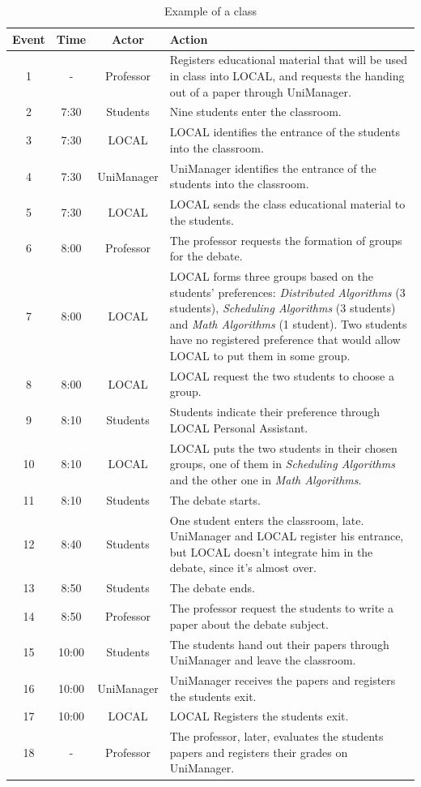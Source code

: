\documentclass{svjour3}                     %
\begin{document}
\begin{table}\centering\footnotesize
    \begin{tabular*}{1\textwidth}{@{}cccp{6.8cm}@{}}
    \toprule
    Event & Time & Actor & Action \\
    \midrule
    1 & - & Professor & Registers educational material that will be used in
class into LOCAL, and requests the handing out of a paper through UniManager. \\
    2 & 7:30 & Students & Nine students enter the classroom. \\
    3 & 7:30 & LOCAL & LOCAL identifies the entrance of the students into the classroom. \\
    4 & 7:30 & UniManager & UniManager identifies the entrance of the students into the classroom. \\
    5 & 7:30 & LOCAL & LOCAL sends the class educational material to the students. \\
    6 & 8:00 & Professor & The professor requests the formation of groups for the debate. \\
    7 & 8:00 & LOCAL & LOCAL forms three groups based on the students' preferences: {\em Distributed Algorithms} (3 students), {\em Scheduling Algorithms} (3 students) and {\em Math Algorithms} (1 student). Two students have no registered preference that would allow LOCAL to put them in some group. \\
    8 & 8:00 & LOCAL & LOCAL request the two students to choose a group. \\
    9 & 8:10 & Students & Students indicate their preference through LOCAL Personal Assistant. \\
    10 & 8:10 & LOCAL & LOCAL puts the two students in their chosen groups, one of them in {\em Scheduling Algorithms} and the other one in {\em Math Algorithms}. \\
    11 & 8:10 & Students & The debate starts. \\
    12 & 8:40 & Students & One student enters the classroom, late. UniManager and LOCAL register his entrance, but LOCAL doesn't integrate him in the debate, since it's almost over.\\
    13 & 8:50 & Students & The debate ends. \\
    14 & 8:50 & Professor & The professor request the students to write a paper about the debate subject.\\
    15 & 10:00 & Students & The students hand out their papers through UniManager and leave the classroom.\\
    16 & 10:00 & UniManager & UniManager receives the papers and registers the students exit.\\
    17 & 10:00 & LOCAL & LOCAL Registers the students exit.\\
    18 & - & Professor & The professor, later, evaluates the students papers and registers their grades on UniManager.\\
    \bottomrule
  \end{tabular*}
  \caption{Example of a class}
  \label{tab:aula}
\end{table}
\end{document}
